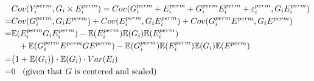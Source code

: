 \documentclass{article}
\newcommand{\expec}{\mathbb{E}}
\begin{document}
\begin{equation}
\begin{split}
&	Cov(Y_i^{perm}, G_i\times E_i^{perm} )  = Cov(G^{perm}_i+E_i^{perm} +G_i^{perm}E_i^{perm} + \varepsilon_i^{perm}, G_iE_i^{perm}) \\
= &Cov(G_i^{perm}, G_iE^{perm}) + Cov(E_i^{perm}, G_iE_i^{perm}) + Cov(G_i^{perm}E^{perm}, G_iE^{perm}) \\
= & \expec(E_i^{perm}G_iE_i^{perm})-\expec(E_i^{perm})\expec(G_i)\expec(E_i^{perm}) \\
& \hspace{0.3cm} +\expec(G^{perm}_iE^{perm}GE^{perm})-\expec(G^{perm}_i)\expec(E_i^{perm})\expec(G_i)\expec(E^{perm})\\
= &\big(1+\expec(G_i)\big)\cdot \expec(G_i)\cdot Var(E_i)\\
= & 0\hspace{0.3cm} (\text{given that } G \text{ is centered and scaled})
\end{split}
\end{equation}
\end{document}
